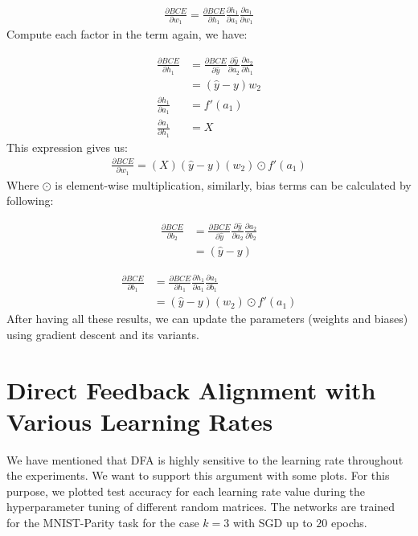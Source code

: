 \documentclass[a4paper, nobind]{templates/ociamthesis}
\begin{document}
\[
\begin{aligned} 
\frac{\partial BCE}{\partial w_{1}}=\frac{\partial BCE}{\partial h_1} \frac{\partial h_1}{\partial a_{1}} \frac{\partial a_{1}}{\partial w_{1}}
\end{aligned}
\]
Compute each factor in the term again, we have:

\[
\begin{aligned}
\frac{\partial BCE}{\partial h_1} &= \frac{\partial BCE}{\partial \hat{y}} \frac{\partial \hat{y}}{\partial a_{2}} \frac{\partial a_{2}}{\partial h_{1}}  \\
&= \left(\hat{y}-y\right) w_{2} \\
\frac{\partial h_1}{\partial a_{1}} &=f'(a_1) \\
\frac{\partial a_{1}}{\partial h_{1}} &=X
\end{aligned}
\]
This expression gives us:
\[
\begin{aligned}
\frac{\partial BCE}{\partial w_{1}}= \left(X\right)\left(\hat{y}-y\right)\left(w_{2}\right) \odot f'(a_1)
\end{aligned}
\]
Where \(\odot\) is element-wise multiplication, similarly, bias terms can be calculated by following:

\[
\begin{aligned} 
\frac{\partial BCE}{\partial b_{2}}&=\frac{\partial BCE}{\partial \hat{y}} \frac{\partial \hat{y}}{\partial a_{2}} \frac{\partial a_{2}}{\partial b_{2}} \\
&= \left(\hat{y}-y\right)
\end{aligned}
\]

\[
\begin{aligned} 
\frac{\partial BCE}{\partial b_{1}}&=\frac{\partial BCE}{\partial h_1} \frac{\partial h_1}{\partial a_{1}} \frac{\partial a_{1}}{\partial b_{1}} \\
&= \left(\hat{y}-y\right)\left(w_{2}\right) \odot f'(a_1)
\end{aligned}
\]
After having all these results, we can update the parameters (weights and biases) using gradient descent and its variants.

\hypertarget{chap:appendix_b}{%
\chapter{Direct Feedback Alignment with Various Learning Rates}\label{chap:appendix_b}}

We have mentioned that DFA is highly sensitive to the learning rate throughout the experiments. We want to support this argument with some plots. For this purpose, we plotted test accuracy for each learning rate value during the hyperparameter tuning of different random matrices. The networks are trained for the MNIST-Parity task for the case \(k=3\) with SGD up to \(20\) epochs.
\end{document}
